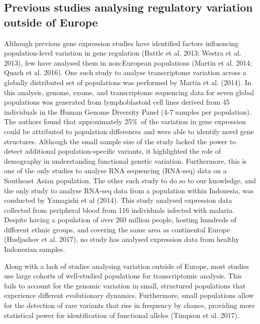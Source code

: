 \documentclass[12pt,a4paper,titlepage,twoside,openright]{book}
\begin{document}
\begin{mainmatter}
\section{Previous studies analysing regulatory variation outside of Europe}
Although previous gene expression studies have identified factors influencing population-level variation in gene regulation (Battle et al. 2013; Westra et al. 2013), few have analysed them in non-European populations (Martin et al. 2014; Quach et al. 2016). One such study to analyse transcriptome variation across a globally distributed set of populations was performed by Martin et al. (2014). In this analysis, genome, exome, and transcriptome sequencing data for seven global populations was generated from lymphoblastoid cell lines derived from 45 individuals in the Human Genome Diversity Panel (4-7 samples per population). The authors found that approximately 25\%\ of the variation in gene expression could be attributed to population differences and were able to identify novel gene structures. Although the small sample size of the study lacked the power to detect additional population-specific variants, it highlighted the role of demography in understanding functional genetic variation. Furthermore, this is one of the only studies to analyse RNA sequencing (RNA-seq) data on a Southeast Asian population. The other such study to do so to our knowledge, and the only study to analyse RNA-seq data from a population within Indonesia, was conducted by Yamagishi et al (2014). This study analysed expression data collected from peripheral blood from 116 individuals infected with malaria. Despite having a population of over 260 million people, hosting hundreds of different ethnic groups, and covering the same area as continental Europe (Hudjashov et al. 2017), no study has analysed expression data from healthy Indonesian samples.

Along with a lack of studies analysing variation outside of Europe, most studies use large cohorts of well-studied populations for transcriptomic analysis. This fails to account for the genomic variation in small, structured populations that experience different evolutionary dynamics. Furthermore, small populations allow for the detection of rare variants that rise in frequency by chance, providing more statistical power for identification of functional alleles (Timpson et al. 2017). 


\end{mainmatter}
\end{document}
